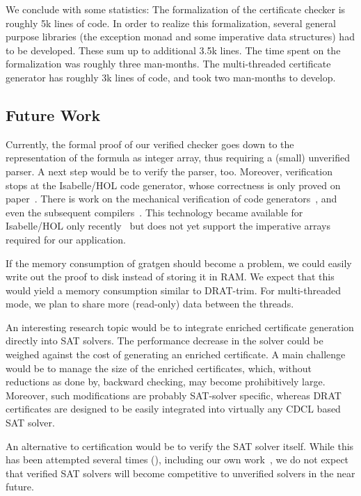 \documentclass[smallcondensed]{svjour3}     %
\begin{document}
We conclude with some statistics: The formalization of the certificate checker is roughly 5k lines of code.
In order to realize this formalization, several general purpose libraries (\eg the exception monad and some imperative data structures) had to be developed. 
These sum up to additional 3.5k lines. The time spent on the formalization was roughly three man-months. The multi-threaded certificate generator has roughly 3k 
lines of code, and took two man-months to develop.

\subsection{Future Work}
Currently, the formal proof of our verified checker goes down to the representation of the formula as integer array,
thus requiring a (small) unverified parser. A next step would be to verify the parser, too.
Moreover, verification stops at the Isabelle/HOL code generator, whose correctness is only proved on paper~\cite{HaNi10,HKKN13}. 
There is work on the mechanical verification of code generators~\cite{MO14}, and even the subsequent compilers~\cite{KMNO14}.
This technology became available for Isabelle/HOL only recently~\cite{HuNi18} but does not yet support the imperative arrays required for our application.

If the memory consumption of gratgen should become a problem, we could easily write out the proof to disk instead of storing it in RAM. 
We expect that this would yield a memory consumption similar to DRAT-trim. For multi-threaded mode, we plan to share more (read-only) data between the threads.

An interesting research topic would be to integrate enriched certificate generation directly into SAT solvers. 
The performance decrease in the solver could be weighed against the cost of generating an enriched certificate.
A main challenge would be to manage the size of the enriched certificates, which, without reductions as done by, 
\eg backward checking, may become prohibitively large.
Moreover, such modifications are probably SAT-solver specific, whereas DRAT certificates are designed to be
easily integrated into virtually any CDCL based SAT solver.

An alternative to certification would be to verify the SAT solver itself. While this has been attempted several times (\eg \cite{Maric10,OSOC12}), 
including our own work~\cite{FBL18}, we do not expect that verified SAT solvers will become competitive to unverified solvers in the near future.
\end{document}
